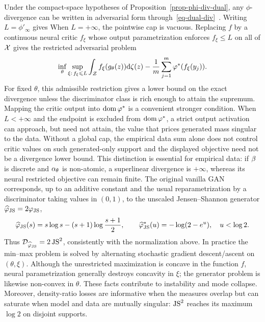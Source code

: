 Under the compact-space hypotheses of Proposition~\ref{prop-phi-div-dual}, any $\phi$-divergence can be written in adversarial form through~\eqref{eq-dual-div}~\cite{NowozinCsekeTomioka2016fGAN}. Writing $L=\phi'_\infty$ gives
When $L=+\infty$, the pointwise cap is vacuous. Replacing $f$ by a continuous neural critic $f_\xi$ whose output parametrization enforces $f_\xi\leq L$ on all of $\mathcal{X}$ gives the restricted adversarial problem
\[
	\inf_\theta\sup_{\xi:\,f_\xi\leqslant L}
	\int_{\mathcal{Z}} f_\xi(g_\theta(z))\mathrm{d}\zeta(z)
	-
	\frac1m\sum_{j=1}^m \varphi^*(f_\xi(y_j)).
\]
For fixed $\theta$, this admissible restriction gives a lower bound on the exact divergence unless the discriminator class is rich enough to attain the supremum. Mapping the critic output into $\operatorname{dom}\varphi^*$ is a convenient stronger condition. When $L<+\infty$ and the endpoint is excluded from $\operatorname{dom}\varphi^*$, a strict output activation can approach, but need not attain, the value that prices generated mass singular to the data. Without a global cap, the empirical data sum alone does not control critic values on such generated-only support and the displayed objective need not be a divergence lower bound. This distinction is essential for empirical data: if $\beta$ is discrete and $\alpha_\theta$ is non-atomic, a superlinear divergence is $+\infty$, whereas its neural restricted objective can remain finite. The original vanilla GAN~\cite{GAN} corresponds, up to an additive constant and the usual reparametrization by a discriminator taking values in $(0,1)$, to the unscaled Jensen--Shannon generator $\widehat{\varphi}_{\operatorname{JS}}=2\varphi_{\operatorname{JS}}$,
\[
	\widehat{\varphi}_{\operatorname{JS}}(s)=s\log s-(s+1)\log\frac{s+1}{2},
	\qquad
	\widehat{\varphi}_{\operatorname{JS}}^*(u)=-\log(2-e^u),\quad u<\log 2.
\]
Thus $\mathcal{D}_{\widehat{\varphi}_{\operatorname{JS}}}=2\operatorname{JS}^2$, consistently with the normalization above. In practice the min--max problem is solved by alternating stochastic gradient descent/ascent on $(\theta,\xi)$. Although the unrestricted maximization is concave in the function $f$, neural parametrization generally destroys concavity in $\xi$; the generator problem is likewise non-convex in $\theta$. These facts contribute to instability and mode collapse. Moreover, density-ratio losses are informative when the measures overlap but can saturate when model and data are mutually singular: $\operatorname{JS}^2$ reaches its maximum $\log 2$ on disjoint supports.

